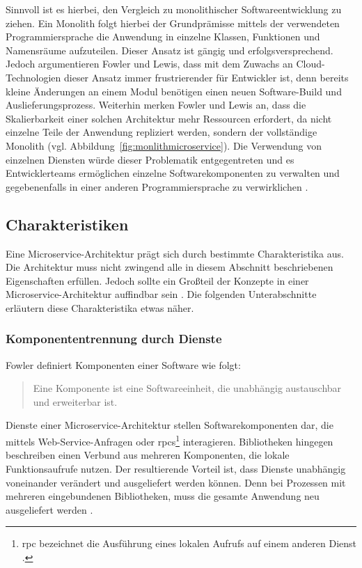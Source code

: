 Sinnvoll ist es hierbei, den Vergleich zu monolithischer Softwareentwicklung zu ziehen. 
Ein Monolith folgt hierbei der Grundprämisse mittels der verwendeten Programmiersprache die Anwendung in einzelne Klassen, Funktionen und Namensräume aufzuteilen. 
Dieser Ansatz ist gängig und erfolgsversprechend. 
Jedoch argumentieren Fowler und Lewis, dass mit dem Zuwachs an Cloud-Technologien dieser Ansatz immer frustrierender für Entwickler ist, denn bereits kleine Änderungen an einem Modul benötigen einen neuen Software-Build und Auslieferungsprozess. 
Weiterhin merken Fowler und Lewis an, dass die Skalierbarkeit einer solchen Architektur mehr Ressourcen erfordert, da nicht einzelne Teile der Anwendung repliziert werden, sondern der vollständige Monolith (vgl. Abbildung~\ref{fig:monlithmicroservice}).
Die Verwendung von einzelnen Diensten würde dieser Problematik entgegentreten und es Entwicklerteams ermöglichen einzelne Softwarekomponenten zu verwalten und gegebenenfalls in einer anderen Programmiersprache zu verwirklichen \cite{FowlerMicroservice}.

\subsection{Charakteristiken}

Eine Microservice-Architektur prägt sich durch bestimmte Charakteristika aus. 
Die Architektur muss nicht zwingend alle in diesem Abschnitt beschriebenen Eigenschaften erfüllen. 
Jedoch sollte ein Großteil der Konzepte in einer Microservice-Architektur auffindbar sein \cite{FowlerMicroservice}. 
Die folgenden Unterabschnitte erläutern diese Charakteristika etwas näher.

\subsubsection{Komponententrennung durch Dienste}\label{TrennungdurchDienste}
Fowler definiert Komponenten einer Software wie folgt: \begin{quote}\glqq Eine Komponente ist eine Softwareeinheit, die unabhängig austauschbar und erweiterbar ist.\grqq{} \cite{FowlerSoftwareComponent} \end{quote}

Dienste einer Microservice-Architektur stellen Softwarekomponenten dar, die mittels Web-Service-Anfragen oder \acp{rpc}\footnote{\acs{rpc} bezeichnet die Ausführung eines lokalen Aufrufs auf einem anderen Dienst \cite{BuildingMicroservicesNewmanChapter5}.} interagieren.
Bibliotheken hingegen beschreiben einen Verbund aus mehreren Komponenten, die lokale Funktionsaufrufe nutzen. 
Der resultierende Vorteil ist, dass Dienste unabhängig voneinander verändert und ausgeliefert werden können. 
Denn bei Prozessen mit mehreren eingebundenen Bibliotheken, muss die gesamte Anwendung neu ausgeliefert werden \cite{FowlerMicroservice}. 

